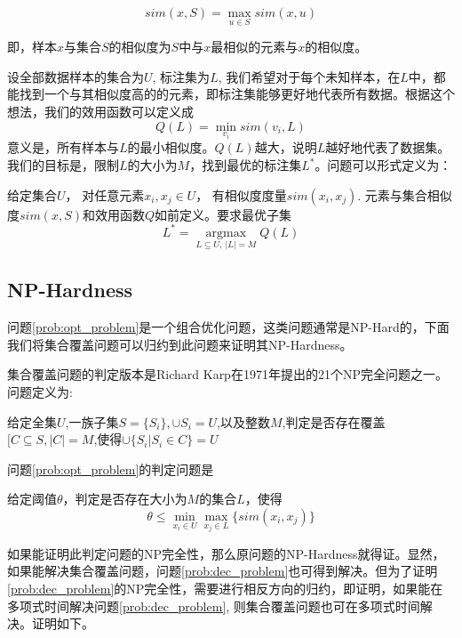 \begin{definition}
\[
    sim(x, S) = \mathop {\max }\limits_{u \in S} sim(x,u)
\]
\end{definition}
即，样本$x$与集合$S$的相似度为$S$中与$x$最相似的元素与$x$的相似度。

设全部数据样本的集合为$U$, 标注集为$L$, 我们希望对于每个未知样本，在$L$中，都能找到一个与其相似度高的的元素，即标注集能够更好地代表所有数据。根据这个想法，我们的效用函数可以定义成
\[
    Q(L) = \mathop {\min }\limits_{{v_i}} sim({v_i},L)
\]
意义是，所有样本与$L$的最小相似度。$Q(L)$越大，说明$L$越好地代表了数据集。我们的目标是，限制$L$的大小为$M$，找到最优的标注集$L^*$。问题可以形式定义为：

\begin{problem}\label{prob:opt_problem}
给定集合$U$， 对任意元素$x_i, x_j \in U$， 有相似度度量$sim(x_i,x_j)$. 元素与集合相似度$sim(x, S)$和效用函数$Q$如前定义。要求最优子集
\[
        {L^*} = \mathop {\arg \max }\limits_{L \subseteq U, \ |L| = M} Q(L)
\]
\end{problem}

\subsection{NP-Hardness}
\label{sec:nph}
问题\ref{prob:opt_problem}是一个组合优化问题，这类问题通常是NP-Hard的，下面我们将集合覆盖问题可以归约到此问题来证明其NP-Hardness。

集合覆盖问题的判定版本是Richard Karp在1971年提出的21个NP完全问题之一。问题定义为:

\begin{problem}[集合覆盖]
\label{prob:set_cover}
给定全集$U$,一族子集$S=\{S_i\}, \cup {S_i} = U$,以及整数$M$,判定是否存在覆盖$[C \subseteq S,|C|=M$,使得$\cup \{ {S_i}|{S_i} \in C\}  = U$
\end{problem}

问题\ref{prob:opt_problem}的判定问题是
\begin{problem}
\label{prob:dec_problem}
给定阈值$\theta$，判定是否存在大小为$M$的集合$L$，使得
\[
    \theta  \le \mathop {\min }\limits_{{x_i} \in U} \mathop {\max }\limits_{{x_j} \in L} \{ sim({x_i},{x_j})\} 
\]
\end{problem}

如果能证明此判定问题的NP完全性，那么原问题的NP-Hardness就得证。显然，如果能解决集合覆盖问题，问题\ref{prob:dec_problem}也可得到解决。但为了证明\ref{prob:dec_problem}的NP完全性，需要进行相反方向的归约，即证明，如果能在多项式时间解决问题\ref{prob:dec_problem}, 则集合覆盖问题也可在多项式时间解决。证明如下。

